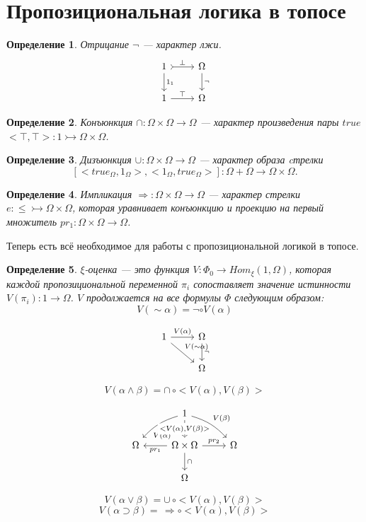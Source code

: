 \documentclass[a4paper, 12pt]{article}
\newtheorem{definition}{Определение}
\begin{document}
\pagebreak
\section{Пропозициональная логика в топосе}

\begin{definition}
Отрицание $\neg$ --- характер лжи.
\[
\begin{tikzcd}
1 \arrow{d}{1_1} \arrow[tail]{r}{\bot}
& \Omega \arrow{d}{\neg} \\
1 \arrow{r}{\top}
& \Omega
\end{tikzcd}
\]
\end{definition}

\begin{definition}
Конъюнкция $\cap\colon \Omega\times\Omega\to\Omega$ --- характер
произведения пары $true$ $<\top, \top>\colon 1\rightarrowtail \Omega\times\Omega$.
\end{definition}

\begin{definition}
Дизъюнкция $\cup\colon \Omega\times\Omega\to\Omega$ --- характер
образа cтрелки $$[<true_\Omega, 1_\Omega>, <1_\Omega, true_\Omega>]\colon \Omega+\Omega\to \Omega\times\Omega.$$
\end{definition}

\begin{definition}
Импликация $\Rightarrow\colon \Omega\times\Omega\to\Omega$ --- характер стрелки $e\colon\le\rightarrowtail\Omega\times\Omega$, которая
уравнивает конъюнкцию и проекцию на первый множитель $pr_1\colon \Omega\times\Omega\to\Omega$.
\end{definition}

Теперь есть всё необходимое для работы с пропозициональной логикой в топосе.

\begin{definition}
$\xi$-оценка --- это функция $V\colon\Phi_0\to Hom_\xi(1, \Omega)$, которая каждой пропозициональной переменной $\pi_i$ сопоставляет значение истинности $V(\pi_i)\colon 1\to \Omega$. $V$ продолжается на все формулы $\Phi$ следующим образом:
$$V(\sim\alpha)=\neg\circ V(\alpha)$$

\[
\begin{tikzcd}
1  \arrow{rd}{V(\sim\alpha)} \arrow{r}{V(\alpha)}
& \Omega \arrow{d}{\neg} \\
& \Omega
\end{tikzcd}
\]

$$V(\alpha\wedge\beta)=\cap\,\circ <V(\alpha),V(\beta)>$$

\[
\begin{tikzcd}
& 1  \arrow[near end, bend right=15]{ld}{V(\alpha)} 
\arrow[dashrightarrow]{d}[description]{<V(\alpha),V(\beta)>}
\arrow[bend left=15]{rd}{V(\beta)} & \\ 
\Omega 
& \Omega\times\Omega 
\arrow{l}{pr_1}  \arrow{d}{\cap} \arrow{r}{pr_2} & \Omega \\
& \Omega &
\end{tikzcd}
\]


$$V(\alpha\vee\beta)=\cup\,\circ <V(\alpha),V(\beta)>$$
$$V(\alpha\supset\beta)=\,\Rightarrow\circ <V(\alpha),V(\beta)>$$
\end{definition}
\end{document}
